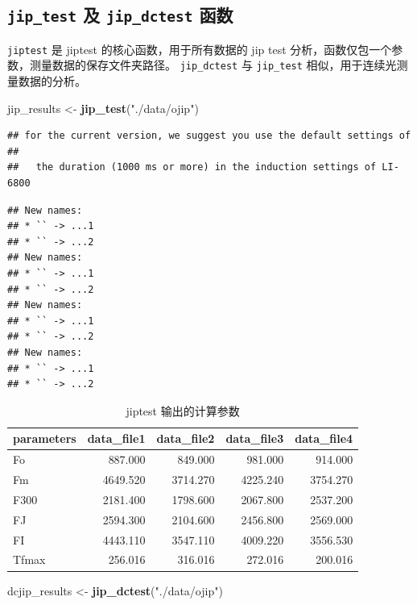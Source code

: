 \documentclass[
]{krantz}
\makeatletter
\newenvironment{Shaded}{\begin{snugshade}}{\end{snugshade}}
\newcommand{\KeywordTok}[1]{\textcolor[rgb]{0.13,0.29,0.53}{\textbf{#1}}}
\newcommand{\NormalTok}[1]{#1}
\newcommand{\StringTok}[1]{\textcolor[rgb]{0.31,0.60,0.02}{#1}}
\newenvironment{kframe}{%
\medskip{}
\setlength{\fboxsep}{.8em}
 \def\at@end@of@kframe{}%
 \ifinner\ifhmode%
  \def\at@end@of@kframe{\end{minipage}}%
  \begin{minipage}{\columnwidth}%
 \fi\fi%
 \def\FrameCommand##1{\hskip\@totalleftmargin \hskip-\fboxsep
 \colorbox{shadecolor}{##1}\hskip-\fboxsep
     \hskip-\linewidth \hskip-\@totalleftmargin \hskip\columnwidth}%
 \MakeFramed {\advance\hsize-\width
   \@totalleftmargin\z@ \linewidth\hsize
   \@setminipage}}%
 {\par\unskip\endMakeFramed%
 \at@end@of@kframe}
\renewenvironment{Shaded}{\begin{kframe}}{\end{kframe}}
\makeatother
\begin{document}
\hypertarget{testfluor}{%
\subsection{\texorpdfstring{\texttt{jip\_test} 及 \texttt{jip\_dctest} 函数}{jip\_test 及 jip\_dctest 函数}}\label{testfluor}}

\texttt{jiptest} 是 jiptest 的核心函数，用于所有数据的 jip test 分析，函数仅包一个参数，测量数据的保存文件夹路径。
\texttt{jip\_dctest} 与 \texttt{jip\_test} 相似，用于连续光测量数据的分析。

\begin{Shaded}
\begin{Highlighting}[]
\NormalTok{jip\_results \textless{}{-}}\StringTok{ }\KeywordTok{jip\_test}\NormalTok{(}\StringTok{"./data/ojip"}\NormalTok{)}
\end{Highlighting}
\end{Shaded}

\begin{verbatim}
## for the current version, we suggest you use the default settings of
## 
##   the duration (1000 ms or more) in the induction settings of LI-6800
\end{verbatim}

\begin{verbatim}
## New names:
## * `` -> ...1
## * `` -> ...2
## New names:
## * `` -> ...1
## * `` -> ...2
## New names:
## * `` -> ...1
## * `` -> ...2
## New names:
## * `` -> ...1
## * `` -> ...2
\end{verbatim}

\begin{longtable}[t]{lrrrr}
\caption{\label{tab:jipres}jiptest 输出的计算参数}\\
\toprule
parameters & data\_file1 & data\_file2 & data\_file3 & data\_file4\\
\midrule
Fo & 887.000 & 849.000 & 981.000 & 914.000\\
Fm & 4649.520 & 3714.270 & 4225.240 & 3754.270\\
F300 & 2181.400 & 1798.600 & 2067.800 & 2537.200\\
FJ & 2594.300 & 2104.600 & 2456.800 & 2569.000\\
FI & 4443.110 & 3547.110 & 4009.220 & 3556.530\\
\addlinespace
Tfmax & 256.016 & 316.016 & 272.016 & 200.016\\
\bottomrule
\end{longtable}

\begin{Shaded}
\begin{Highlighting}[]
\NormalTok{dcjip\_results \textless{}{-}}\StringTok{ }\KeywordTok{jip\_dctest}\NormalTok{(}\StringTok{"./data/ojip"}\NormalTok{)}
\end{Highlighting}
\end{Shaded}
\end{document}
